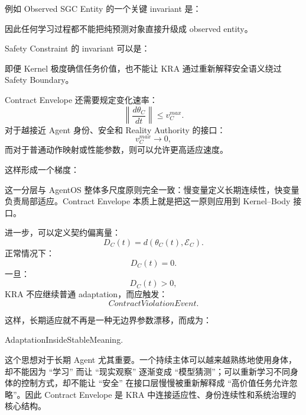 例如 Observed SGC Entity 的一个关键 invariant 是：
\begin{statementbox}
\centering
{}
\end{statementbox}
因此任何学习过程都不能把纯预测对象直接升级成 observed entity。

Safety Constraint 的 invariant 可以是：
\begin{statementbox}
\centering
{}
\end{statementbox}
即便 Kernel 极度确信任务价值，也不能让 KRA 通过重新解释安全语义绕过 Safety Boundary。

Contract Envelope 还需要规定变化速率：
\[
\left\|
\frac{d\theta_C}{dt}
\right\|
\le
v_C^{max}.
\]
对于越接近 Agent 身份、安全和 Reality Authority 的接口：
\[
v_C^{max}\rightarrow0,
\]
而对于普通动作映射或性能参数，则可以允许更高适应速度。

这样形成一个梯度：
\begin{statementbox}
\centering
{}
\end{statementbox}
\begin{statementbox}
\centering
{}
\end{statementbox}
\begin{statementbox}
\centering
{}
\end{statementbox}

这一分层与 AgentOS 整体多尺度原则完全一致：慢变量定义长期连续性，快变量负责局部适应。Contract Envelope 本质上就是把这一原则应用到 Kernel--Body 接口。

进一步，可以定义契约偏离量：
\[
D_C(t)
=
d(
\theta_C(t),
\mathcal E_C
).
\]
正常情况下：
\[
D_C(t)=0.
\]
一旦：
\[
D_C(t)>0,
\]
KRA 不应继续普通 adaptation，而应触发：
\[
ContractViolationEvent.
\]

这样，长期适应就不再是一种无边界参数漂移，而成为：
\begin{statementbox}
AdaptationInsideStableMeaning.
\end{statementbox}

这个思想对于长期 Agent 尤其重要。一个持续主体可以越来越熟练地使用身体，却不能因为 ``学习'' 而让 ``现实观察'' 逐渐变成 ``模型猜测''；可以重新学习不同身体的控制方式，却不能让 ``安全'' 在接口层慢慢被重新解释成 ``高价值任务允许忽略''。因此 Contract Envelope 是 KRA 中连接适应性、身份连续性和系统治理的核心结构。

